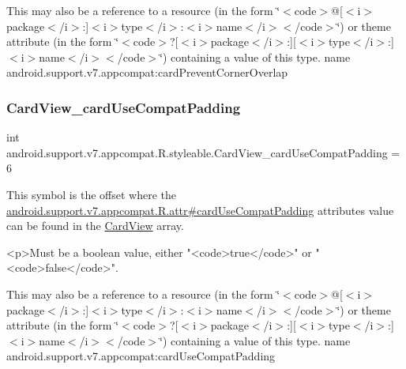 This may also be a reference to a resource (in the form \char`\"{}$<$code$>$@\mbox{[}$<$i$>$package$<$/i$>$\+:\mbox{]}$<$i$>$type$<$/i$>$\+:$<$i$>$name$<$/i$>$$<$/code$>$\char`\"{}) or theme attribute (in the form \char`\"{}$<$code$>$?\mbox{[}$<$i$>$package$<$/i$>$\+:\mbox{]}\mbox{[}$<$i$>$type$<$/i$>$\+:\mbox{]}$<$i$>$name$<$/i$>$$<$/code$>$\char`\"{}) containing a value of this type.  name android.\+support.\+v7.\+appcompat\+:card\+Prevent\+Corner\+Overlap \mbox{\label{classandroid_1_1support_1_1v7_1_1appcompat_1_1R_1_1styleable_a1a6356bd6696f8ac7e1e285c83dd4fe4}} 
\subsubsection{\texorpdfstring{Card\+View\+\_\+card\+Use\+Compat\+Padding}{CardView\_cardUseCompatPadding}}
{\footnotesize\ttfamily int android.\+support.\+v7.\+appcompat.\+R.\+styleable.\+Card\+View\+\_\+card\+Use\+Compat\+Padding = 6\hspace{0.3cm}{\ttfamily [static]}}

This symbol is the offset where the \hyperlink{classandroid_1_1support_1_1v7_1_1appcompat_1_1R_1_1attr_a77f77f99bdcd93281a13980ef0141585}{android.\+support.\+v7.\+appcompat.\+R.\+attr\#card\+Use\+Compat\+Padding} attribute\textquotesingle{}s value can be found in the \hyperlink{classandroid_1_1support_1_1v7_1_1appcompat_1_1R_1_1styleable_aee2dd81febffbeeaeff51a35af0f87ec}{Card\+View} array.

\begin{DoxyVerb}      <p>Must be a boolean value, either "<code>true</code>" or "<code>false</code>".
\end{DoxyVerb}
 

This may also be a reference to a resource (in the form \char`\"{}$<$code$>$@\mbox{[}$<$i$>$package$<$/i$>$\+:\mbox{]}$<$i$>$type$<$/i$>$\+:$<$i$>$name$<$/i$>$$<$/code$>$\char`\"{}) or theme attribute (in the form \char`\"{}$<$code$>$?\mbox{[}$<$i$>$package$<$/i$>$\+:\mbox{]}\mbox{[}$<$i$>$type$<$/i$>$\+:\mbox{]}$<$i$>$name$<$/i$>$$<$/code$>$\char`\"{}) containing a value of this type.  name android.\+support.\+v7.\+appcompat\+:card\+Use\+Compat\+Padding \mbox{\label{classandroid_1_1support_1_1v7_1_1appcompat_1_1R_1_1styleable_a36926c090c4a75eb729564a1baa98a51}} 
